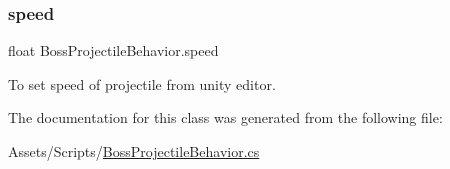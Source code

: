 \subsubsection{\texorpdfstring{speed}{speed}}
{\footnotesize\ttfamily float Boss\+Projectile\+Behavior.\+speed}



To set speed of projectile from unity editor. 



The documentation for this class was generated from the following file\+:\begin{DoxyCompactItemize}
\item 
Assets/\+Scripts/\mbox{\hyperlink{_boss_projectile_behavior_8cs}{Boss\+Projectile\+Behavior.\+cs}}\end{DoxyCompactItemize}
